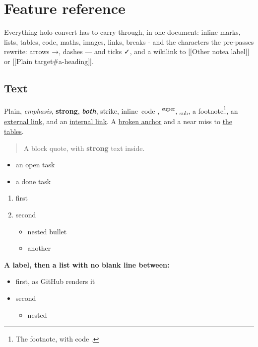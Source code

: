 \documentclass[
]{article}
\author{}
\date{}
\providecommand{\tightlist}{%
  \setlength{\itemsep}{0pt}\setlength{\parskip}{0pt}}
\renewcommand{\texttt}[1]{%
  \colorbox{termbg}{{\ttfamily\relsize{-1}\color{termfg}#1}}%
}
\begin{document}
\section{Feature reference}\label{feature-reference}

Everything holo-convert has to carry through, in one document: inline
marks, lists, tables, code, maths, images, links, breaks - and the
characters the pre-passes rewrite: arrows →, dashes --- and ticks ✓, and
a wikilink to {[}{[}Other note\textbar a label{]}{]} or {[}{[}Plain
target\#a-heading{]}{]}.

\subsection{Text}\label{text}

Plain, \emph{emphasis}, \textbf{strong}, \textbf{\emph{both}},
\st{strike}, \texttt{inline\ code}, \textsuperscript{super},
\textsubscript{sub}, a footnote\footnote{The footnote, with
  \texttt{code}.}, an \href{https://example.org}{external link}, and an
\hyperref[tables]{internal link}. A \hyperref[nowhere-at-all]{broken
anchor} and a near miss to \hyperref[tabels]{the tables}.

\begin{quote}
A block quote, with \textbf{strong} text inside.
\end{quote}

\begin{itemize}
\tightlist
\item[$\square$]
  an open task
\item[$\boxtimes$]
  a done task
\end{itemize}

\begin{enumerate}
\def\labelenumi{\arabic{enumi}.}
\tightlist
\item
  first
\item
  second

  \begin{itemize}
  \tightlist
  \item
    nested bullet
  \item
    another
  \end{itemize}
\end{enumerate}

\textbf{A label, then a list with no blank line between:}

\begin{itemize}
\tightlist
\item
  first, as GitHub renders it
\item
  second

  \begin{itemize}
  \tightlist
  \item
    nested
  \end{itemize}
\end{itemize}
\end{document}
